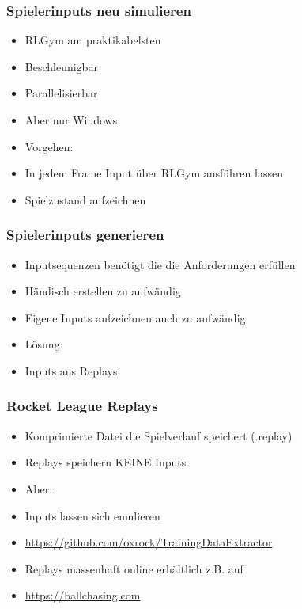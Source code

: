 \documentclass{beamer}
\begin{document}
\begin{frame}
\begin{minipage}[c]{0.28\textwidth}
\begin{minipage}[c]{0.15\textheight}
 \end{minipage}
\end{minipage}
 \end{frame}

 \begin{frame}
 \frametitle{Spielerinputs neu simulieren}
\begin{itemize}
 \item RLGym am praktikabelsten
 \item Beschleunigbar
 \item Parallelisierbar
 \item Aber nur Windows
 \item Vorgehen:
 \item In jedem Frame Input über RLGym ausführen lassen
 \item Spielzustand aufzeichnen
\end{itemize}
 \end{frame}

 \begin{frame}
 \frametitle{Spielerinputs generieren}
\begin{itemize}
 \item Inputsequenzen benötigt die die Anforderungen erfüllen
 \item Händisch erstellen zu aufwändig
 \item Eigene Inputs aufzeichnen auch zu aufwändig
 \item Lösung:
 \item Inputs aus Replays
\end{itemize}
 \end{frame}

 \begin{frame}
 \frametitle{Rocket League Replays}
\begin{itemize}
 \item Komprimierte Datei die Spielverlauf speichert (.replay)
 \item Replays speichern KEINE Inputs
 \item Aber:
 \item Inputs lassen sich emulieren
 \item \url{https://github.com/oxrock/TrainingDataExtractor}
 \item Replays massenhaft online erhältlich z.B. auf
 \item \url{https://ballchasing.com}
\end{itemize}
 \end{frame}
\end{document}
